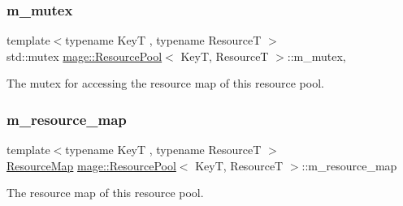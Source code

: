\subsubsection{\texorpdfstring{m\+\_\+mutex}{m\_mutex}}
{\footnotesize\ttfamily template$<$typename KeyT , typename ResourceT $>$ \\
std\+::mutex \mbox{\hyperlink{classmage_1_1_resource_pool}{mage\+::\+Resource\+Pool}}$<$ KeyT, ResourceT $>$\+::m\+\_\+mutex\hspace{0.3cm}{\ttfamily [mutable]}, {\ttfamily [private]}}

The mutex for accessing the resource map of this resource pool. \mbox{\label{classmage_1_1_resource_pool_a5b72496aa427f783a6de90d8ee7ff2a5}} 
\subsubsection{\texorpdfstring{m\+\_\+resource\+\_\+map}{m\_resource\_map}}
{\footnotesize\ttfamily template$<$typename KeyT , typename ResourceT $>$ \\
\mbox{\hyperlink{classmage_1_1_resource_pool_a7ae3cfa639bbc3696fa359673fed6153}{Resource\+Map}} \mbox{\hyperlink{classmage_1_1_resource_pool}{mage\+::\+Resource\+Pool}}$<$ KeyT, ResourceT $>$\+::m\+\_\+resource\+\_\+map\hspace{0.3cm}{\ttfamily [private]}}

The resource map of this resource pool. 